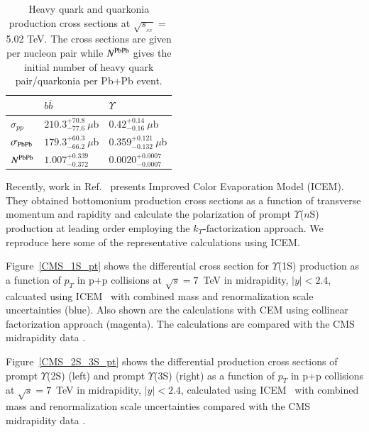 \begin{table}
  \begin{center}
\caption[]{Heavy quark and quarkonia production  cross sections at
$\sqrt{s_{_{_{NN}}}}=$ 5.02 TeV. The cross sections are given per nucleon pair while
$N^{\rm PbPb}$ gives the initial number of heavy quark pair/quarkonia per Pb+Pb event.}
\label{NLOcros}
\begin{tabular}{l|l|l} 
\hline 
\hline
                        & $ b \overline b$                    & $\Upsilon$   \\              
\hline
$\sigma_{pp}$            & $210.3^{+70.8}_{-77.6}~\mu$b            & $0.42^{+0.14}_{-0.16}~\mu$b  \\


$\sigma_{\rm PbPb}$        & $179.3^{+60.3}_{-66.2}~\mu$b             & 0.359$^{+0.121}_{-0.132}~\mu$b  \\



$N^{\rm PbPb}$              & $1.007^{+0.339}_{-0.372}$               & $0.0020^{+0.0007}_{-0.0007}$   \\

\hline
\hline
\end{tabular}
\end{center}
\end{table}


Recently, work in Ref.~\cite{Cheung:2018upe} presents Improved Color Evaporation Model
(ICEM). They obtained bottomonium production cross sections as a function of
transverse momentum and rapidity and calculate the polarization of prompt
$\varUpsilon$($n$S) production at leading order employing the $k_T$-factorization approach.
We reproduce here some of the representative calculations using ICEM.

Figure~\ref{CMS_1S_pt} shows the
differential cross section for $\varUpsilon$(1S) production as a function
  of $p_T$ in p+p collisions at $\sqrt{s} = 7$~TeV in midrapidity, $|y|<2.4$, calcuated using
ICEM~\cite{Cheung:2018upe} with combined mass and renormalization scale
uncertainties (blue).  Also shown are the calculations with CEM using collinear
factorization approach (magenta).
 The calculations are compared with the CMS midrapidity data \cite{CMS:2013qur}.

Figure~\ref{CMS_2S_3S_pt} shows the
differential production cross sections of prompt $\varUpsilon$(2S) (left)
  and prompt $\varUpsilon$(3S) (right) as a function
  of $p_T$ in p+p collisions at $\sqrt{s} = 7$~TeV in midrapidity, $|y|<2.4$, 
  calculated using ICEM~\cite{Cheung:2018upe} with combined mass and renormalization
  scale uncertainties compared with the CMS midrapidity data \cite{CMS:2013qur}.

